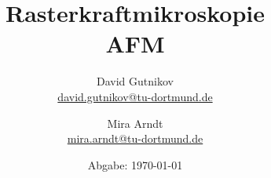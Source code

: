 

\title{Rasterkraftmikroskopie\\
\small{AFM}}
\author{%
  David Gutnikov\\%
  \href{mailto:david.gutnikov@tu-dortmund.de}{david.gutnikov@tu-dortmund.de} \and
  Mira Arndt\\
  \href{mailto:mira.arndt@tu-dortmund.de}{mira.arndt@tu-dortmund.de}%
}
\date{
  Abgabe: \today %
}
\publishers{TU Dortmund – Fakultät Physik}
\makeatletter         
\def\@maketitle{
\raggedright
\texttt{[image: bilder/lo\_TU-Do\_2008/logo\_rgb\_jpg/tud\_logo\_rgb.jpg]}\\[8ex]
\begin{center}
{\Huge \bfseries \sffamily \@title }\\[4ex] 
{\Large  \@author}\\[4ex] 
\@date\\[8ex]
\publishers\\
\end{center}}
\makeatother





\maketitle
\thispagestyle{empty}
\tableofcontents
\newpage
% 
% 

 
 \newpage
 \nocite{*}
 \printbibliography

